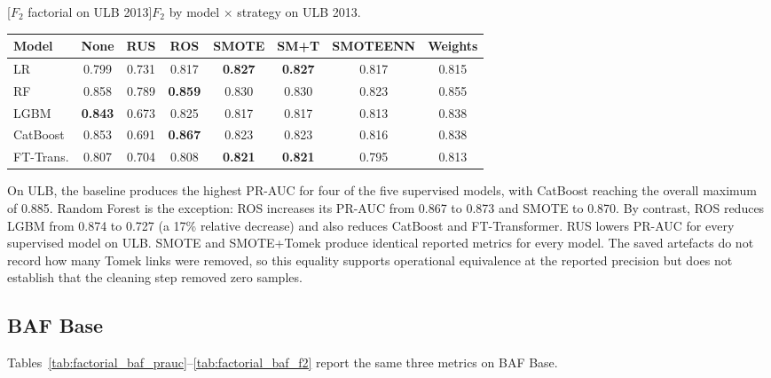\noindent\begin{minipage}{\linewidth}\centering
{}[$F_2$ factorial on ULB 2013]{$F_2$ by model $\times$ strategy on ULB 2013.}
\label{tab:factorial_ulb_f2}
\begin{tabular}{l c c c c c c c}
\toprule
Model & None & RUS & ROS & SMOTE & SM+T & SMOTEENN & Weights \\
\midrule
LR         & 0.799 & 0.731 & 0.817 & \textbf{0.827} & \textbf{0.827} & 0.817 & 0.815 \\
RF         & 0.858 & 0.789 & \textbf{0.859} & 0.830 & 0.830 & 0.823 & 0.855 \\
LGBM       & \textbf{0.843} & 0.673 & 0.825 & 0.817 & 0.817 & 0.813 & 0.838 \\
CatBoost   & 0.853 & 0.691 & \textbf{0.867} & 0.823 & 0.823 & 0.816 & 0.838 \\
FT-Trans.  & 0.807 & 0.704 & 0.808 & \textbf{0.821} & \textbf{0.821} & 0.795 & 0.813 \\
\bottomrule
\end{tabular}
\end{minipage}

On ULB, the baseline produces the highest PR-AUC for four of the five supervised models, with CatBoost reaching the overall maximum of 0.885. Random Forest is the exception: ROS increases its PR-AUC from 0.867 to 0.873 and SMOTE to 0.870. By contrast, ROS reduces LGBM from 0.874 to 0.727 (a 17\% relative decrease) and also reduces CatBoost and FT-Transformer. RUS lowers PR-AUC for every supervised model on ULB. SMOTE and SMOTE+Tomek produce identical reported metrics for every model. The saved artefacts do not record how many Tomek links were removed, so this equality supports operational equivalence at the reported precision but does not establish that the cleaning step removed zero samples.


\subsection{BAF Base}

Tables~\ref{tab:factorial_baf_prauc}--\ref{tab:factorial_baf_f2} report the same three metrics on BAF Base.

